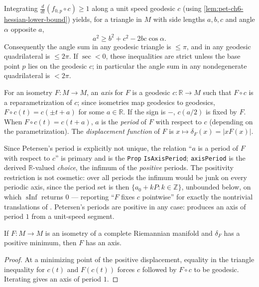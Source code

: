 \begin{remark}
  \label{rem:pet-ch6-triangle-comparison}

  Integrating $\frac{d}{dt}(f_{0,p}\circ c)\ge1$ along a unit speed geodesic
  $c$ (using \cref{lem:pet-ch6-hessian-lower-bound}) yields, for a triangle in
  $M$ with side lengths $a,b,c$ and angle $\alpha$ opposite $a$,
  \[
    a^2\ge b^2+c^2-2bc\cos\alpha.
  \]
  Consequently the angle sum in any geodesic triangle is $\le\pi$, and in any
  geodesic quadrilateral is $\le2\pi$. If $\sec<0$, these inequalities are
  strict unless the base point $p$ lies on the geodesic $c$; in particular the
  angle sum in any nondegenerate quadrilateral is $<2\pi$.
\end{remark}

\begin{definition}
  \label{def:pet-ch6-axis-displacement}


  For an isometry $F:M\to M$, an \emph{axis} for $F$ is a geodesic
  $c:\mathbb{R}\to M$ such that $F\circ c$ is a reparametrization of $c$; since
  isometries map geodesics to geodesics, $F\circ c(t)=c(\pm t+a)$ for some
  $a\in\mathbb{R}$. If the sign is $-$, $c(a/2)$ is fixed by $F$. When
  $F\circ c(t)=c(t+a)$, $a$ is the \emph{period} of $F$ with respect to $c$
  (depending on the parametrization). The \emph{displacement function} of $F$
  is $x\mapsto\delta_F(x)=|xF(x)|$.

  Since Petersen's period is explicitly not unique, the relation
  ``$a$ is a period of $F$ with respect to $c$'' is primary and is the
  \texttt{Prop} \texttt{IsAxisPeriod}; \texttt{axisPeriod} is the
  derived $\mathbb{R}$-valued \emph{choice}, the infimum of the
  \emph{positive} periods. The positivity restriction is not cosmetic: over all
  periods the infimum would be junk on every periodic axis, since the period
  set is then $\{a_0+kP:k\in\mathbb{Z}\}$, unbounded below, on which
  $\operatorname{sInf}$ returns $0$ --- reporting ``$F$ fixes $c$ pointwise''
  for exactly the nontrivial translations of .
  Petersen's periods are positive in any case: 
  produces an axis of period $1$ from a unit-speed segment.
\end{definition}

\begin{lemma}
  \label{lem:pet-ch6-axis-existence}

  If $F:M\to M$ is an isometry of a complete Riemannian manifold and
  $\delta_F$ has a positive minimum, then $F$ has an axis.
\end{lemma}
\begin{proof}
  \sketch
  At a minimizing point of the positive displacement, equality in the triangle inequality for \(c(t)\) and \(F(c(t))\) forces \(c\) followed by \(F\circ c\) to be geodesic. Iterating gives an axis of period \(1\).
\end{proof}

